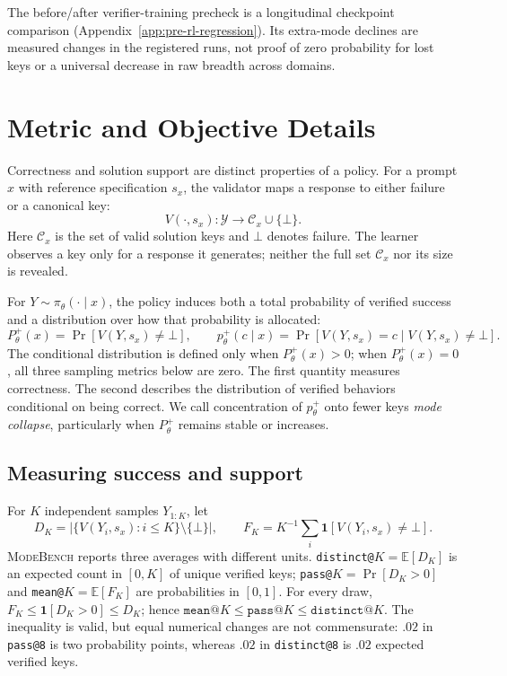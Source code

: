 \documentclass{article}
\newcommand{\1}{\mathbf 1}
\newcommand{\E}{\mathbb E}
\newcommand{\mb}{\textsc{ModeBench}}
\theoremstyle{remark}
\theoremstyle{definition}
\theoremstyle{plain}
\begin{document}
The before/after verifier-training precheck is a longitudinal checkpoint
comparison (Appendix~\ref{app:pre-rl-regression}). Its extra-mode declines
are measured changes in the registered runs, not proof of zero probability
for lost keys or a universal decrease in raw breadth across domains.

\section{Metric and Objective Details}
\label{app:metric-details}

Correctness and solution support are distinct properties of a policy. For a
prompt $x$ with reference specification $s_x$, the validator maps a response
to either failure or a canonical key:
\[
  V(\cdot,s_x):\mathcal Y\rightarrow \mathcal C_x\cup\{\bot\}.
\]
Here $\mathcal C_x$ is the set of valid solution keys and $\bot$ denotes
failure. The learner observes a key only for a response it generates; neither
the full set $\mathcal C_x$ nor its size is revealed.

For $Y\sim\pi_\theta(\cdot\mid x)$, the policy induces both a total probability
of verified success and a distribution over how that probability is allocated:
\[
 P_\theta^+(x)=\Pr[V(Y,s_x)\neq\bot],
 \qquad
 p_\theta^+(c\mid x)=\Pr[V(Y,s_x)=c\mid V(Y,s_x)\neq\bot].
\]
The conditional distribution is defined only when $P_\theta^+(x)>0$;
when $P_\theta^+(x)=0$, all three sampling metrics below are zero.
The first quantity measures correctness. The second describes the distribution
of verified behaviors conditional on being correct. We call concentration of
$p_\theta^+$ onto fewer keys \emph{mode collapse}, particularly when
$P_\theta^+$ remains stable or increases.

\subsection{Measuring success and support}
\label{app:metric-sampling}

For $K$ independent samples $Y_{1:K}$, let
\[
  D_K=\bigl|\{V(Y_i,s_x):i\le K\}\setminus\{\bot\}\bigr|,
  \qquad
  F_K=K^{-1}\sum_i \1[V(Y_i,s_x)\neq\bot].
\]
\mb{} reports three averages with different units. \texttt{distinct@}$K
=\E[D_K]$ is an expected count in $[0,K]$ of unique verified keys;
\texttt{pass@}$K=\Pr[D_K>0]$ and \texttt{mean@}$K=\E[F_K]$ are probabilities
in $[0,1]$. For every draw, $F_K\le\1[D_K>0]\le D_K$; hence
$\texttt{mean@}K\le\texttt{pass@}K\le\texttt{distinct@}K$. The inequality is
valid, but equal numerical changes are not commensurate: $.02$ in
\texttt{pass@8} is two probability points, whereas $.02$ in
\texttt{distinct@8} is $.02$ expected verified keys.
\end{document}
